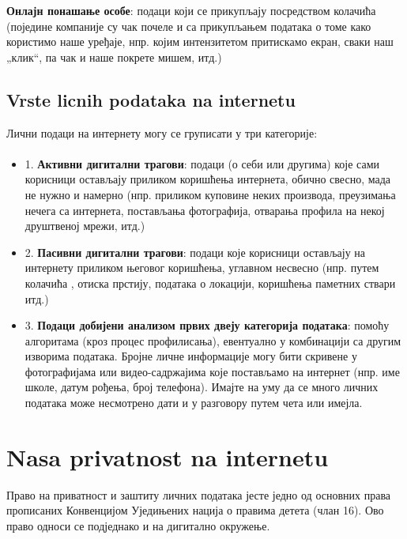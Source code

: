 \documentclass[a4paper]{article}
\begin{document}
\textbf{Онлајн понашање особе}: подаци који се прикупљају посредством колачића (поједине компаније су чак почеле и са прикупљањем података о томе како користимо наше уређаје, нпр. којим интензитетом притискамо екран, сваки наш „клик“, па чак и наше покрете мишем, итд.)
\subsection{Vrste licnih podataka na internetu}

Лични подаци на интернету могу се груписати у три категорије:

\paragraph{}
\begin{itemize}


\item    1. \textbf{Активни дигитални трагови}: подаци (о себи или другима) које сами корисници остављају приликом коришћења интернета, обично свесно, мада не нужно и намерно  (нпр. приликом куповине неких производа, преузимања нечега са интернета, постављања фотографија, отварања профила на некој друштвеној мрежи, итд.)
    
\item    2. \textbf{Пасивни дигитални трагови}: подаци које корисници остављају на интернету приликом његовог коришћења, углавном несвесно (нпр. путем колачића , отиска прстију, података о локацији, коришћења паметних ствари итд.)
    
\item    3. \textbf{Подаци добијени анализом првих двеју категорија података}: помоћу алгоритама  (кроз процес профилисања), евентуално у комбинацији са другим изворима података.
Бројне личне информације могу бити скривене у фотографијама или видео-садржајима које постављамо на интернет (нпр. име школе, датум рођења, број телефона). Имајте на уму да се много личних података може несмотрено дати и у разговору путем чета или имејла.
\end{itemize}
\section{Nasa privatnost na internetu}

Право на приватност и заштиту личних података јесте једно од основних права прописаних Конвенцијом Уједињених нација о правима детета (члан 16). Ово право односи се подједнако и на дигитално окружење.
\end{document}
